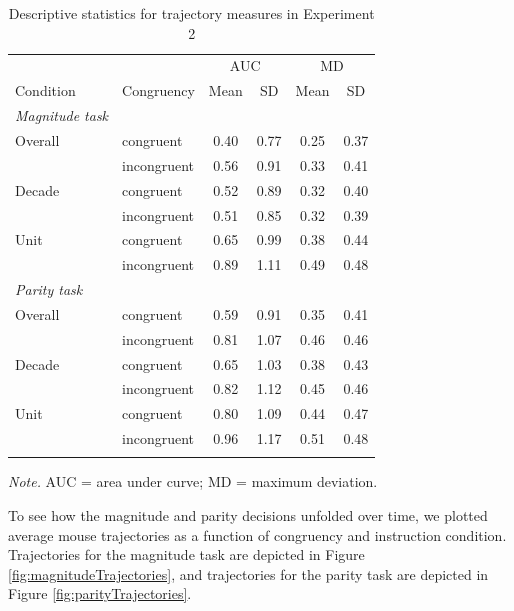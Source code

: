 \documentclass[english,man]{apa6}
\theoremstyle{definition}
\theoremstyle{definition}
\theoremstyle{definition}
\theoremstyle{remark}
\begin{document}
\begin{table}[tbp]
\begin{center}
\begin{threeparttable}
\caption{\label{tab:exp2table-traj}Descriptive statistics for trajectory measures in Experiment 2}
\begin{tabular}{llcccc}
\toprule
 &  & \multicolumn{2}{c}{AUC} & \multicolumn{2}{c}{MD} \\
\cmidrule(r){3-4} \cmidrule(r){5-6}
Condition & \multicolumn{1}{c}{Congruency} & \multicolumn{1}{c}{Mean} & \multicolumn{1}{c}{SD} & \multicolumn{1}{c}{Mean} & \multicolumn{1}{c}{SD}\\
\midrule
{\it Magnitude task} &  &  &  &  & \\
Overall & congruent & 0.40 & 0.77 & 0.25 & 0.37\\
 & incongruent & 0.56 & 0.91 & 0.33 & 0.41\\
Decade & congruent & 0.52 & 0.89 & 0.32 & 0.40\\
 & incongruent & 0.51 & 0.85 & 0.32 & 0.39\\
Unit & congruent & 0.65 & 0.99 & 0.38 & 0.44\\
 & incongruent & 0.89 & 1.11 & 0.49 & 0.48\\
{\it Parity task} &  &  &  &  & \\
Overall & congruent & 0.59 & 0.91 & 0.35 & 0.41\\
 & incongruent & 0.81 & 1.07 & 0.46 & 0.46\\
Decade & congruent & 0.65 & 1.03 & 0.38 & 0.43\\
 & incongruent & 0.82 & 1.12 & 0.45 & 0.46\\
Unit & congruent & 0.80 & 1.09 & 0.44 & 0.47\\
 & incongruent & 0.96 & 1.17 & 0.51 & 0.48\\
\bottomrule
\addlinespace
\end{tabular}
\begin{tablenotes}[para]
\textit{Note.} AUC = area under curve; MD = maximum deviation.
\end{tablenotes}
\end{threeparttable}
\end{center}
\end{table}

To see how the magnitude and parity decisions unfolded over time, we
plotted average mouse trajectories as a function of congruency and
instruction condition. Trajectories for the magnitude task are depicted
in Figure \ref{fig:magnitudeTrajectories}, and trajectories for the
parity task are depicted in Figure \ref{fig:parityTrajectories}.
\end{document}
